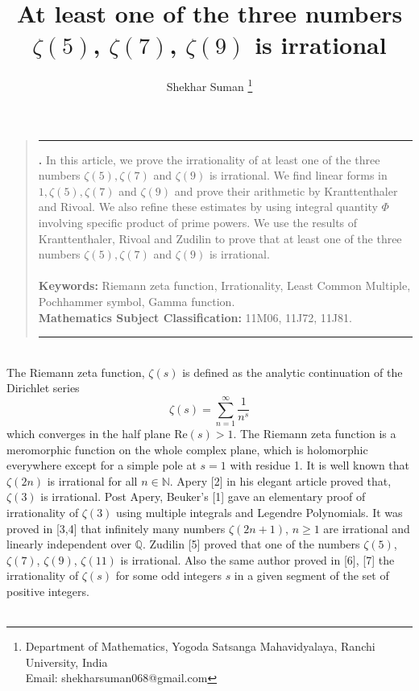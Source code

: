 \documentclass[12pt]{article}
\title{\textbf{At least one of the three numbers $\zeta(5)$, $\zeta(7)$, $\zeta(9)$ is irrational}}
\author{Shekhar Suman \footnote{Department of Mathematics, Yogoda Satsanga Mahavidyalaya, Ranchi University, India\\
Email: shekharsuman068@gmail.com} \date{}}
\begin{document}
\maketitle
\renewenvironment{abstract}
{\begin{quote}
\noindent \rule{\linewidth}{.5pt}\par{\bfseries \abstractname.}}
{\medskip\noindent \rule{\linewidth}{.5pt}
\end{quote}
}
 \begin{abstract} In this article, we prove the irrationality of at least one of the three numbers $\zeta(5), \zeta(7)$ and $\zeta(9)$ is irrational. We find linear forms in $1,\zeta(5),\zeta(7)$ and $\zeta(9)$ and prove their arithmetic by Kranttenthaler and Rivoal. We also refine these estimates by using integral quantity $\Phi$ involving specific product of prime powers. We use the results of Kranttenthaler, Rivoal and Zudilin to prove that at least one of the three numbers $\zeta(5), \zeta(7)$ and $\zeta(9)$ is irrational.
\\\\ 
\textbf{Keywords:} Riemann zeta function, Irrationality, Least Common Multiple, Pochhammer symbol, Gamma function.\\
\textbf{Mathematics Subject Classification:} 11M06, 11J72, 11J81.\\
  \end{abstract}
\\
The Riemann zeta function, $\zeta(s)$ is defined as the analytic continuation  of the Dirichlet series
$$\zeta(s) = \sum_{n=1}^{{\infty}} \frac{1}{n^s}$$ which converges in the half plane $\text{Re}(s)>1$. The Riemann zeta function is a meromorphic function on the whole complex plane, which is holomorphic everywhere except for a simple pole at $s=1$ with residue 1. It is well known that $\zeta(2n)$ is irrational for all $n\in\mathbb{N}$. Apery [2] in his elegant article proved that, $\zeta(3)$ is irrational. Post Apery, Beuker's [1] gave an elementary proof of irrationality of $\zeta(3)$ using multiple integrals and Legendre Polynomials. It was proved in [3,4] that infinitely many numbers $\zeta(2n+1)$, $n\geq 1$ are irrational and linearly independent  over $\mathbb{Q}$. Zudilin [5] proved that one of the numbers $\zeta(5)$, $\zeta(7)$, $\zeta(9)$, $\zeta(11)$ is irrational. Also the same author proved in [6], [7] the irrationality of $\zeta(s)$ for some odd integers $s$ in a given segment of the set of positive integers.
\pagebreak\\\\
\end{document}
